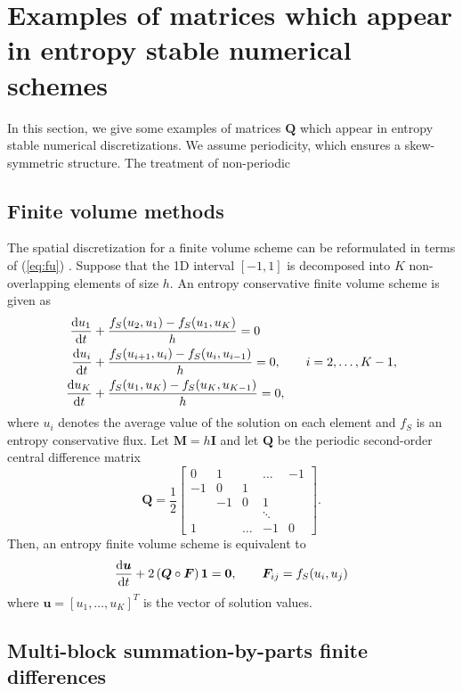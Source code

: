 \documentclass{article}
\newcommand{\td}[2]{\frac{{\rm d}#1}{{\rm d}{ {#2}}}}
\newcommand{\LRp}[1]{\left( #1 \right)}
\newcommand{\LRs}[1]{\left[ #1 \right]}
\newcommand{\eq}[1]{\begin{align*}#1\end{align*}}
\begin{document}
\section{Examples of matrices which appear in entropy stable numerical schemes}

In this section, we give some examples of matrices $\bm{Q}$ which appear in entropy stable numerical discretizations.  We assume periodicity, which ensures a skew-symmetric structure.  The treatment of non-periodic

\subsection{Finite volume methods}

The spatial discretization for a finite volume scheme can be reformulated in terms of (\ref{eq:fu}) \cite{chan2019entropy}.  Suppose that the 1D interval $[-1,1]$ is decomposed into $K$ non-overlapping elements of size $h$.  An entropy conservative finite volume scheme is given as
\eq{
\td{u_1}{t} &+ \frac{f_S(u_{2},u_1) - f_S(u_1,u_{K})}{h} = 0\\
\td{u_i}{t} &+ \frac{f_S(u_{i+1},u_i) - f_S(u_i,u_{i-1})}{h} = 0, \qquad i = 2,\ldots, K-1,\\
\td{u_K}{t} &+ \frac{f_S(u_{1},u_K) - f_S(u_K,u_{K-1})}{h} = 0,
}
where $u_i$ denotes the average value of the solution on each element and $f_S$ is an entropy conservative flux.  Let $\bm{M} = h\bm{I}$ and let $\bm{Q}$ be the periodic second-order central difference matrix
\[
\bm{Q} = \frac{1}{2}\begin{bmatrix}
0 & 1 & &\ldots & -1\\
-1 & 0 & 1 &&  \\
& -1 & 0 & 1 &  \\
 & & & \ddots &  \\
1 & &\ldots  & -1 & 0
\end{bmatrix}.
\]
Then, an entropy finite volume scheme is equivalent to 
\[
\td{\bm{u}}{t} + 2\LRp{\bm{Q}\circ\bm{F}}\bm{1} = \bm{0}, \qquad \bm{F}_{ij} = f_S(u_i,u_j)
\]
where $\bm{u} = \LRs{u_1,\ldots, u_K}^T$ is the vector of solution values.  

\subsection{Multi-block summation-by-parts finite differences}
\end{document}
